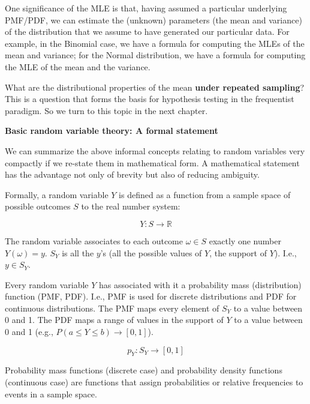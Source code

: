 \documentclass[
  12pt,
]{krantz}
\theoremstyle{definition}
\theoremstyle{definition}
\theoremstyle{definition}
\theoremstyle{definition}
\theoremstyle{remark}
\begin{document}
One significance of the MLE is that, having assumed a particular underlying PMF/PDF, we can estimate the (unknown) parameters (the mean and variance) of the distribution that we assume to have generated our particular data. For example, in the Binomial case, we have a formula for computing the MLEs of the mean and variance; for the Normal distribution, we have a formula for computing the MLE of the mean and the variance.

What are the distributional properties of the mean \textbf{under repeated sampling}? This is a question that forms the basis for hypothesis testing in the frequentist paradigm. So we turn to this topic in the next chapter.

\begin{blackbox}

\textbf{Basic random variable theory: A formal statement}

We can summarize the above informal concepts relating to random variables very compactly if we re-state them in mathematical form. A mathematical statement has the advantage not only of brevity but also of reducing ambiguity.

Formally, a random variable \(Y\) is defined as a function from a sample space of possible outcomes \(S\) to the real number system:

\begin{equation}
Y : S \rightarrow \mathbb{R}
\end{equation}

The random variable associates to each outcome \(\omega \in S\) exactly one number \(Y(\omega) = y\). \(S_Y\) is all the \(y\)'s (all the possible values of \(Y\), the support of \(Y\)). I.e., \(y \in S_Y\).

Every random variable \(Y\) has associated with it a probability mass (distribution) function (PMF, PDF). I.e., PMF is used for discrete distributions and PDF for continuous distributions. The PMF maps every element of \(S_Y\) to a value between 0 and 1. The PDF maps a range of values in the support of \(Y\) to a value between 0 and 1 (e.g., \(P(a \leq Y\leq b) \rightarrow [0, 1]\)).

\begin{equation}
p_Y : S_Y \rightarrow [0, 1] 
\end{equation}

Probability mass functions (discrete case) and probability density functions (continuous case) are functions that assign probabilities or relative frequencies to events in a sample space.


\end{blackbox}
\end{document}
